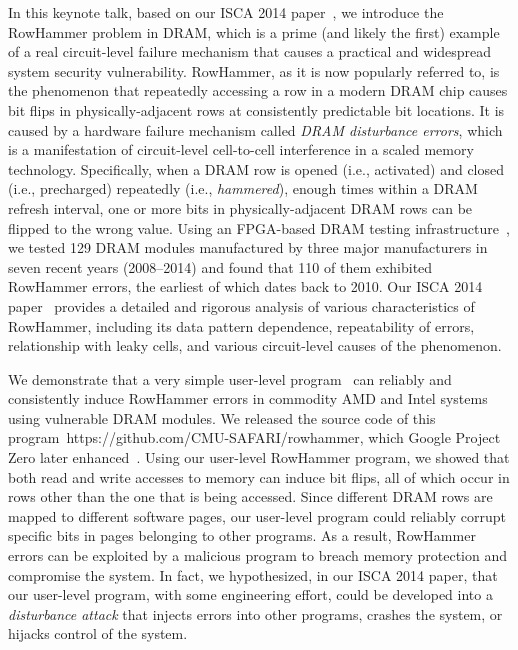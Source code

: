 \documentclass[runningheads]{llncs}
\begin{document}
In this keynote talk, based on our ISCA 2014
paper~\cite{rowhammer-isca2014}, we introduce the RowHammer problem in
DRAM, which is a prime (and likely the first) example of a real
circuit-level failure mechanism that causes a practical and widespread
system security vulnerability. RowHammer, as it is now popularly
referred to, is the phenomenon that repeatedly accessing a row in a
modern DRAM chip causes bit flips in physically-adjacent rows at
consistently predictable bit locations. It is caused by a hardware
failure mechanism called {\em DRAM disturbance errors}, which is a
manifestation of circuit-level cell-to-cell interference in a scaled
memory technology. Specifically, when a DRAM row is opened (i.e.,
activated) and closed (i.e., precharged) repeatedly (i.e., {\em
  hammered}), enough times within a DRAM refresh interval, one or more
bits in physically-adjacent DRAM rows can be flipped to the wrong
value. Using an FPGA-based DRAM testing
infrastructure~\cite{dram-isca2013,softmc}, we tested 129 DRAM modules
manufactured by three major manufacturers in seven recent years
(2008--2014) and found that 110 of them exhibited RowHammer errors,
the earliest of which dates back to 2010. Our ISCA 2014
paper~\cite{rowhammer-isca2014} provides a detailed and rigorous
analysis of various characteristics of RowHammer, including its data
pattern dependence, repeatability of errors, relationship with leaky
cells, and various circuit-level causes of the phenomenon.
  
We demonstrate that a very simple user-level
program~\cite{rowhammer-isca2014,safari-rowhammer} can reliably and
consistently induce RowHammer errors in commodity AMD and Intel
systems using vulnerable DRAM modules. We released the source code of
this program~https://github.com/CMU-SAFARI/rowhammer, which Google Project Zero later
enhanced~\cite{google-rowhammer-test}. Using our user-level RowHammer
program, we showed that both read and write accesses to memory can
induce bit flips, all of which occur in rows other than the one that
is being accessed. Since different DRAM rows are mapped to different
software pages, our user-level program could reliably corrupt specific
bits in pages belonging to other programs. As a result, RowHammer
errors can be exploited by a malicious program to breach memory
protection and compromise the system. In fact, we hypothesized, in our
ISCA 2014 paper, that our user-level program, with some engineering
effort, could be developed into a {\em disturbance attack} that
injects errors into other programs, crashes the system, or hijacks
control of the system.
\end{document}

